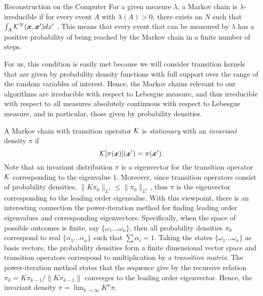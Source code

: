 \begin{chapter}{Reconstruction on the Computer}
For a given measure $\lambda$, a Markov chain is $\lambda$-irreducible if for every event $A$ with $\lambda(A) > 0$, there exists an $N$ such that $\int_A \mathcal K^N(\mbox{\boldmath$x$},\mbox{\boldmath$x$}')dx'$ \citep{robert2013monte}. 
This means that every event that can be measured by $\lambda$ has a positive probability of being reached by the Markov chain in a finite number of steps.

For us, this condition is easily met because we will consider transition kernels that are given by probability density functions with full support over the range of the random variables of interest. 
Hence, the Markov chains relevant to our algorithms are irreducible with respect to Lebesgue measure, and thus irreducible with respect to all measures absolutely continuous with respect to Lebesgue measure, and in particular, those given by probability densities.

A Markov chain with transition operator $\mathcal K$ is \emph{stationary} with an \emph{invariant} density $\pi$ if 
\begin{equation} \label{eq:stationarity}
  \mathcal K [\pi(\mbox{\boldmath$x$})](\mbox{\boldmath$x$}') = \pi(\mbox{\boldmath$x$}').
\end{equation}
Note that an invariant distribution $\pi$ is a eigenvector for the transition operator $\mathcal K$ corresponding to the eigenvalue $1$.
Moreover, since transition operators consist of probability densities, $\|K\pi_0\|_{L^1} \le \|\pi_0\|_{L^1}$, thus $\pi$ is the eigenvector corresponding to the leading order eigenvalue.
With this viewpoint, there is an interesting connection the power-iteration method for finding leading order eigenvalues and corresponding eigenvectors.
Specifically, when the space of possible outcomes is finite, say $\{\omega_1\dots \omega_n\}$, then all probability densities $\pi_0$ correspond to real $\{\alpha_1\dots\alpha_n\}$ such that $\sum\alpha_i = 1$.
Taking the states $\{\omega_1\dots \omega_n\}$ as basis vectors, the probability densities form a finite dimensional vector space and transition operators correspond to multiplication by a \emph{transition matrix}.
The power-iteration method states that the sequence give by the recursive relation $\pi_k = K\pi_{k-1}/\|K\pi_{k-1}\|$ converges to the leading order eigenvector. 
Hence, the invariant density $\pi = \lim_{k\to \infty}K^n \pi$.


\end{chapter}
